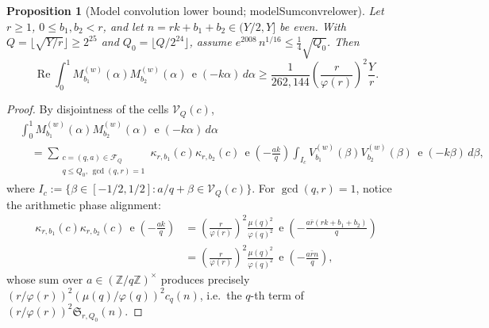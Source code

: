 \documentclass[11pt,reqno]{amsart}
\numberwithin{equation}{section}
\newtheorem{proposition}[theorem]{Proposition}
\theoremstyle{definition}
\newcommand{\Z}{\mathbb{Z}}
\newcommand{\1}{\mathbf{1}}
\newcommand{\e}{\operatorname{e}}
\newcommand{\V}{\mathcal{V}}
\newcommand{\Sing}{\mathfrak{S}}
\renewcommand{\Re}{\operatorname{Re}}
\newcommand{\lean}[1]{{\footnotesize\ttfamily\renewcommand{\_}{\textunderscore\allowbreak}#1}}
\begin{document}
\begin{proposition}[Model convolution lower bound; \lean{modelSum\_conv\_re\_lower}]
\label{prop:model-conv-lower}
Let $r \ge 1$, $0 \le b_1, b_2 < r$, and let $n = r k + b_1 + b_2 \in (Y/2, Y]$ be even. With $Q = \lfloor\sqrt{Y/r}\rfloor \ge 2^{25}$ and $Q_0 = \lfloor Q/2^{24}\rfloor$, assume $e^{2008}\, n^{1/16} \le \frac{1}{4}\sqrt{Q_0}$. Then
\begin{equation}\label{eq:model-conv-lower}
  \Re \int_0^1 M_{b_1}^{(w)}(\alpha) M_{b_2}^{(w)}(\alpha)\, \e(-k\alpha)\,d\alpha
  \ge \frac{1}{262{,}144}\left(\frac{r}{\varphi(r)}\right)^2 \frac{Y}{r}.
\end{equation}
\end{proposition}

\begin{proof}
By disjointness of the cells $\V_Q(c)$,
\begin{align*}
  &\int_0^1 M_{b_1}^{(w)}(\alpha) M_{b_2}^{(w)}(\alpha)\, \e(-k\alpha)\,d\alpha \\
  &\quad = \sum_{\substack{c=(q,a) \in \mathcal{F}_Q \\ q \le Q_0,\, \gcd(q,r)=1}}
    \kappa_{r,b_1}(c)\kappa_{r,b_2}(c)\,\e\!\left(-\frac{ak}{q}\right)
    \int_{I_c} V_{b_1}^{(w)}(\beta) V_{b_2}^{(w)}(\beta)\, \e(-k\beta)\,d\beta,
\end{align*}
where $I_c := \{\beta \in [-1/2, 1/2] : a/q + \beta \in \V_Q(c)\}$. For $\gcd(q, r) = 1$, notice the arithmetic phase alignment:
\begin{align*}
  \kappa_{r,b_1}(c)\kappa_{r,b_2}(c)\,\e\!\left(-\frac{ak}{q}\right)
  &= \left(\frac{r}{\varphi(r)}\right)^2 \frac{\mu(q)^2}{\varphi(q)^2}\,\e\!\left(-\frac{a\bar{r}(rk + b_1 + b_2)}{q}\right) \\
  &= \left(\frac{r}{\varphi(r)}\right)^2 \frac{\mu(q)^2}{\varphi(q)^2}\,\e\!\left(-\frac{a\bar{r} n}{q}\right),
\end{align*}
whose sum over $a \in (\Z/q\Z)^\times$ produces precisely $(r/\varphi(r))^2 (\mu(q)/\varphi(q))^2 c_q(n)$, i.e.\ the $q$-th term of $(r/\varphi(r))^2 \Sing_{r, Q_0}(n)$.


\end{proof}
\end{document}
